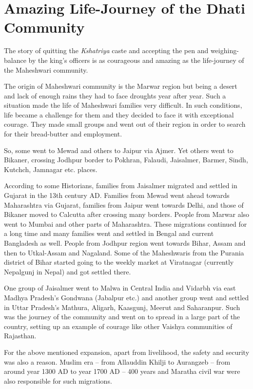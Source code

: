 \chapter{Amazing Life-Journey of the Dhati Community}
The story of quitting the \textit{Kshatriya} caste and accepting the pen and
weighing-balance by the king's officers is as courageous and amazing as the
life-journey of the Maheshwari community.

The origin of Maheshwari community is the Marwar region but being a desert and
lack of enough rains they had to face droughts year after year. Such a
situation made the life of Maheshwari families very difficult. In such
conditions, life became a challenge for them and they decided to face it with
exceptional courage. They made small groups and went out of their region in
order to search for their bread-butter and employment.

So, some went to Mewad and others to Jaipur via Ajmer. Yet others went to
Bikaner, crossing Jodhpur border to Pokhran, Falaudi, Jaisalmer, Barmer, Sindh,
Kutchch, Jamnagar etc. places.

According to some Historians, families from Jaisalmer migrated and settled in
Gujarat in the 13th century AD. Families from Mewad went ahead towards
Maharashtra via Gujarat, families from Jaipur went towards Delhi, and those of
Bikaner moved to Calcutta after crossing many borders. People from Marwar also
went to Mumbai and other parts of Maharashtra. These migrations continued for a
long time and many families went and settled in Bengal and current Bangladesh
as well. People from Jodhpur region went towards Bihar, Assam and then to
Utkal-Assam and Nagaland. Some of the Maheshwaris from the Purania district of
Bihar started going to the weekly market at Viratnagar (currently Nepalgunj in
Nepal) and got settled there.

One group of Jaisalmer went to Malwa in Central India and Vidarbh via east
Madhya Pradesh's Gondwana (Jabalpur etc.) and another group went and settled in
Uttar Pradesh's Mathura, Aligarh, Kaasgunj, Meerut and Saharanpur. Such was the
journey of the community and went on to spread in a large part of the country,
setting up an example of courage like other Vaishya communities of
Rajasthan.

For the above mentioned expansion, apart from livelihood, the safety and
security was also a reason. Muslim era -- from Allauddin Khilji to Aurangzeb --
from around year 1300 AD to year 1700 AD -- 400 years and Maratha civil war
were also responsible for such migrations.

